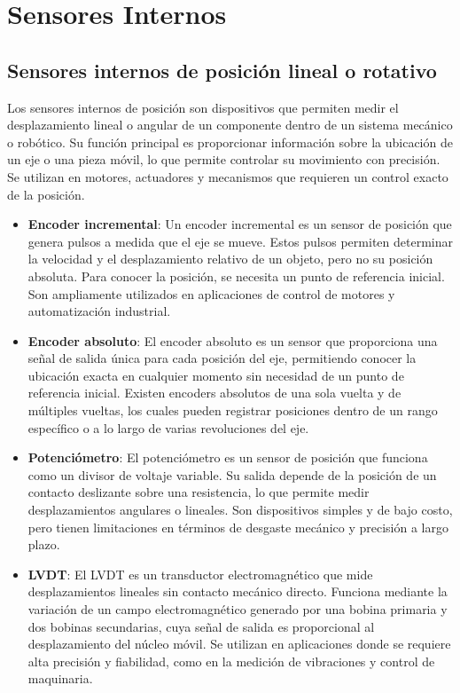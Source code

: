 \section{Sensores Internos}
\subsection{Sensores internos de posición lineal o rotativo}
Los sensores internos de posición son dispositivos que permiten medir el desplazamiento lineal o angular de un componente dentro de un sistema mecánico o robótico. Su función principal es proporcionar información sobre la ubicación de un eje o una pieza móvil, lo que permite controlar su movimiento con precisión. Se utilizan en motores, actuadores y mecanismos que requieren un control exacto de la posición.

\begin{itemize}
\item \textbf{Encoder incremental}: Un encoder incremental es un sensor de posición que genera pulsos a medida que el eje se mueve. Estos pulsos permiten determinar la velocidad y el desplazamiento relativo de un objeto, pero no su posición absoluta. Para conocer la posición, se necesita un punto de referencia inicial. Son ampliamente utilizados en aplicaciones de control de motores y automatización industrial.

\item \textbf{Encoder absoluto}: El encoder absoluto es un sensor que proporciona una señal de salida única para cada posición del eje, permitiendo conocer la ubicación exacta en cualquier momento sin necesidad de un punto de referencia inicial. Existen encoders absolutos de una sola vuelta y de múltiples vueltas, los cuales pueden registrar posiciones dentro de un rango específico o a lo largo de varias revoluciones del eje.

\item \textbf{Potenciómetro}: El potenciómetro es un sensor de posición que funciona como un divisor de voltaje variable. Su salida depende de la posición de un contacto deslizante sobre una resistencia, lo que permite medir desplazamientos angulares o lineales. Son dispositivos simples y de bajo costo, pero tienen limitaciones en términos de desgaste mecánico y precisión a largo plazo.

\item \textbf{LVDT}: El LVDT es un transductor electromagnético que mide desplazamientos lineales sin contacto mecánico directo. Funciona mediante la variación de un campo electromagnético generado por una bobina primaria y dos bobinas secundarias, cuya señal de salida es proporcional al desplazamiento del núcleo móvil. Se utilizan en aplicaciones donde se requiere alta precisión y fiabilidad, como en la medición de vibraciones y control de maquinaria.


\end{itemize}
